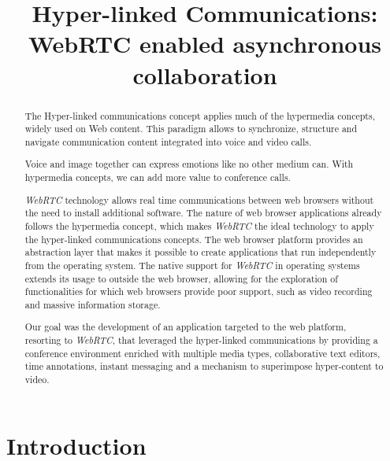 \documentclass[conference,compsoc,a4paper]{IEEEtran}
\begin{document}
\title{Hyper-linked Communications: WebRTC enabled asynchronous collaboration}

\author{
}

\maketitle

\begin{abstract}
The Hyper-linked communications concept applies much of the hypermedia concepts, widely used on Web content. This paradigm allows to synchronize, structure and navigate communication content integrated into voice and video calls.

Voice and image together can express emotions like no other medium can. With hypermedia concepts, we can add more value to conference calls.

\emph{WebRTC} technology allows real time communications between web browsers without the need to install additional software. The nature of web browser applications already follows the hypermedia concept, which makes \emph{WebRTC} the ideal technology to apply the hyper-linked communications concepts.
The web browser platform provides an abstraction layer that makes it possible to create applications that run independently from the operating system.
The native support for \emph{WebRTC} in operating systems extends its usage to outside the web browser, allowing for the exploration of functionalities for which web browsers provide poor support, such as video recording and massive information storage.

Our goal was the development of an application targeted to the web platform, resorting to \emph{WebRTC}, that leveraged the hyper-linked communications by providing a conference environment enriched with multiple media types, collaborative text editors, time annotations, instant messaging and a mechanism to superimpose hyper-content to video.
\end{abstract}

\IEEEpeerreviewmaketitle

\section{Introduction}
\label{chapter:introduction}
\end{document}

